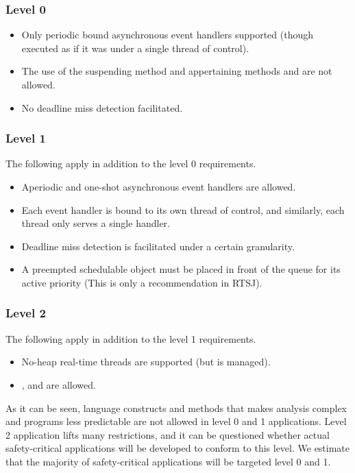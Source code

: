 \subsubsection{Level 0}
\begin{itemize}
	\item Only periodic bound asynchronous event handlers supported (though executed as if it was under a single thread of control).
	\item The use of the suspending method  and appertaining methods  and  are not allowed.
	\item No deadline miss detection facilitated.
\end{itemize}

\subsubsection{Level 1}
The following apply in addition to the level 0 requirements.
\begin{itemize}
	\item Aperiodic and one-shot asynchronous event handlers are allowed.
	\item Each event handler is bound to its own thread of control, and similarly, each thread only serves a single handler.
	\item Deadline miss detection is facilitated under a certain granularity.
	\item A preempted schedulable object must be placed in front of the queue for its active priority (This is only a recommendation in RTSJ).
\end{itemize}

\subsubsection{Level 2}
The following apply in addition to the level 1 requirements.
\begin{itemize}
	\item No-heap real-time threads are supported (but is managed).
	\item {},  and  are allowed.
\end{itemize}

As it can be seen, language constructs and methods that makes analysis complex and programs less predictable are not allowed in level 0 and 1 applications. Level 2 application lifts many restrictions, and it can be questioned whether actual safety-critical applications will be developed to conform to this level. We estimate that the majority of safety-critical applications will be targeted level 0 and 1.

